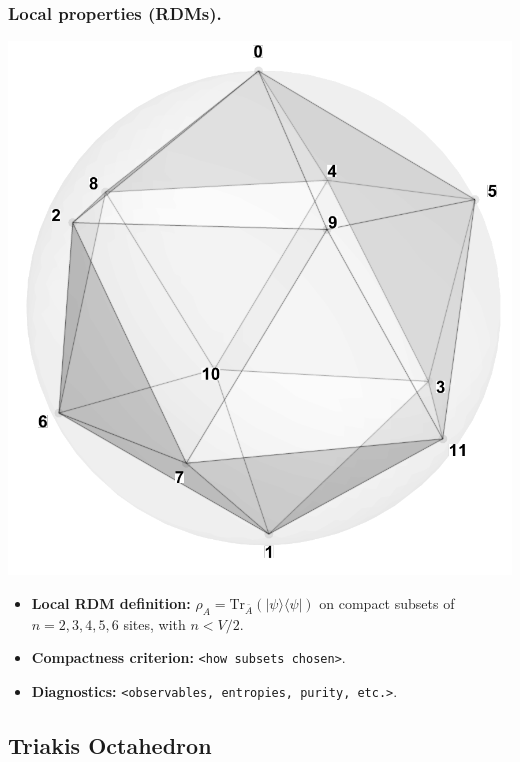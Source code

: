 \documentclass[11pt,a4paper]{article}
\begin{document}
\subsubsection*{Local properties (RDMs).}
\begin{center}
  \includegraphics[width=.6\linewidth]{icosahedron}
\end{center}

\begin{itemize}[leftmargin=1.5em]
  \item \textbf{Local RDM definition:} $\rho_A=\mathrm{Tr}_{\bar A}(|\psi\rangle\langle\psi|)$ on compact subsets of $n=2,3,4,5,6$ sites, with $n < V/2$.
  \item \textbf{Compactness criterion:} \texttt{<how subsets chosen>}.
  \item \textbf{Diagnostics:} \texttt{<observables, entropies, purity, etc.>}.
\end{itemize}


\subsection*{Triakis Octahedron}
\end{document}
